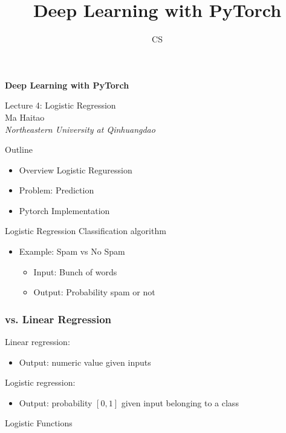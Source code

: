 \documentclass[14 pt]{beamer}
\author[mht]{CS}
\title[Deep Learning with PyTorch]{Deep Learning with PyTorch}
\institute{Northeastern University at Qinhuangdao}
\let\olditem\item
\renewcommand{\item}{\olditem\vspace{4pt}}
\newcommand{\comment}[1]{\textcolor{comment}{\footnotesize{#1}\normalsize}} %
\newcommand{\Comment}[1]{\textcolor{Comment}{\footnotesize{#1}\normalsize}} %
\newcommand{\COMMENT}[1]{\textcolor{COMMENT}{\footnotesize{#1}\normalsize}} %
\begin{document}
\begin{frame}[c]
\begin{center}
	\textcolor{normal text.fg!50!Comment}{\textbf{\Large{Deep Learning with PyTorch}}}
	\vspace{4em}

    \COMMENT{\large{Lecture 4: Logistic Regression}} \\
\vspace{4em}
    \Comment{{Ma Haitao}} \\
\comment{\textit{Northeastern University at Qinhuangdao}}\\
\end{center}
\end{frame}

\begin{frame}{Outline}
  \begin{itemize}
  \item Overview Logistic Reguression 
  \item Problem: Prediction
  \item Pytorch Implementation
  \end{itemize}
\end{frame}

\begin{frame}{Logistic Regression}
   Classification algorithm
  \begin{itemize}
  \item Example: Spam vs No Spam
    \begin{itemize}
    \item  Input: Bunch of words
    \item Output: Probability spam or not
  \end{itemize}
\end{itemize}
\end{frame}

\begin{frame}
  \frametitle{ vs. Linear Regression}
   Linear regression:
  \begin{itemize}
  \item Output: numeric value given inputs
  \end{itemize}
  Logistic regression:
  \begin{itemize}
  \item Output: probability $[0, 1]$ given input belonging to a class
  \end{itemize}
\end{frame}

\begin{frame}
  \begin{center}
      \Large{Logistic Functions}
    \end{center}
\end{frame}
\end{document}
